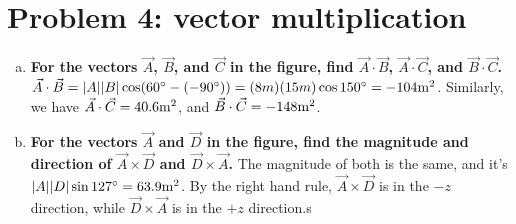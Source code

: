 \documentclass[10pt,letter]{article}
\begin{document}
\section*{Problem 4: vector multiplication}
\begin{enumerate}[(a)]
\item {\bf For the vectors $\vec{A}$, $\vec{B}$, and $\vec{C}$ in the figure, find $\vec{A}\cdot\vec{B}$, $\vec{A}\cdot\vec{C}$, and $\vec{B}\cdot\vec{C}$.}
$\vec{A}\cdot\vec{B}=|A||B|\cos (60^\circ - (-90^\circ)) = (8m)(15m)\cos 150^\circ = -104{\rm m}^2$. Similarly, we have $\vec{A} \cdot \vec{C} = 40.6 {\rm m}^2$, and $\vec{B}\cdot\vec{C} = -148 {\rm m}^2$. 
\item {\bf For the vectors $\vec{A}$ and $\vec{D}$ in the figure, find the magnitude and direction of $\vec{A} \times \vec{D}$ and $\vec{D} \times \vec{A}$.}
The magnitude of both is the same, and it's $|A||D|\sin 127^\circ = 63.9 {\rm m}^2$. By the right hand rule, $\vec{A} \times \vec{D}$ is in the $-z$ direction, while $\vec{D}\times\vec{A}$ is in the $+z$ direction.s
\end{enumerate}
\end{document}
